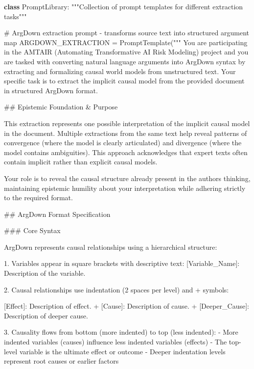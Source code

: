 \documentclass[
  11pt,
  letterpaper,
]{book}
\newenvironment{Shaded}{\begin{snugshade}}{\end{snugshade}}
\newcommand{\CommentTok}[1]{\textcolor[rgb]{0.37,0.37,0.37}{#1}}
\newcommand{\KeywordTok}[1]{\textcolor[rgb]{0.00,0.23,0.31}{\textbf{#1}}}
\newcommand{\NormalTok}[1]{\textcolor[rgb]{0.00,0.23,0.31}{#1}}
\newcommand{\OperatorTok}[1]{\textcolor[rgb]{0.37,0.37,0.37}{#1}}
\newcommand{\StringTok}[1]{\textcolor[rgb]{0.13,0.47,0.30}{#1}}
\begin{document}
\begin{Shaded}
\begin{Highlighting}[]
\KeywordTok{class}\NormalTok{ PromptLibrary:}
    \CommentTok{"""Collection of prompt templates for different extraction tasks"""}

    \CommentTok{\# ArgDown extraction prompt {-} transforms source text into structured argument map}
\NormalTok{    ARGDOWN\_EXTRACTION }\OperatorTok{=}\NormalTok{ PromptTemplate(}\StringTok{"""}
\StringTok{You are participating in the AMTAIR (Automating Transformative AI Risk Modeling) project and you are tasked with converting natural language arguments into ArgDown syntax by extracting and formalizing causal world models from unstructured text.}
\StringTok{Your specific task is to extract the implicit causal model from the provided document in structured ArgDown format.}

\StringTok{\#\# Epistemic Foundation \& Purpose}

\StringTok{This extraction represents one possible interpretation of the implicit causal model in the document. Multiple extractions from the same text help reveal patterns of convergence (where the model is clearly articulated) and divergence (where the model contains ambiguities). This approach acknowledges that expert texts often contain implicit rather than explicit causal models.}

\StringTok{Your role is to reveal the causal structure already present in the author\textquotesingle{}s thinking, maintaining epistemic humility about your interpretation while adhering strictly to the required format.}

\StringTok{\#\# ArgDown Format Specification}

\StringTok{\#\#\# Core Syntax}

\StringTok{ArgDown represents causal relationships using a hierarchical structure:}

\StringTok{1. Variables appear in square brackets with descriptive text:}
\StringTok{   \textasciigrave{}[Variable\_Name]: Description of the variable.\textasciigrave{}}

\StringTok{2. Causal relationships use indentation (2 spaces per level) and \textquotesingle{}+\textquotesingle{} symbols:}

\StringTok{[Effect]: Description of effect. + [Cause]: Description of cause. + [Deeper\_Cause]: Description of deeper cause.}

\StringTok{3. Causality flows from bottom (more indented) to top (less indented):}
\StringTok{{-} More indented variables (causes) influence less indented variables (effects)}
\StringTok{{-} The top{-}level variable is the ultimate effect or outcome}
\StringTok{{-} Deeper indentation levels represent root causes or earlier factors}


\end{Highlighting}
\end{Shaded}
\end{document}
